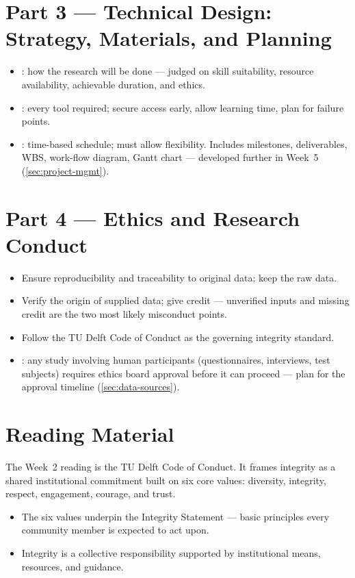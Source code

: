\documentclass[../main.tex]{subfiles}
\begin{document}
\section{Part 3 — Technical Design: Strategy, Materials, and Planning}
\label{sec:strategy-materials}

\begin{itemize}
  \item {}: how the research will be done — judged on skill suitability, resource availability, achievable duration, and ethics.
  \item {}: every tool required; secure access early, allow learning time, plan for failure points.
  \item {}: time-based schedule; must allow flexibility. Includes milestones, deliverables, WBS, work-flow diagram, Gantt chart — developed further in Week~5 (\autoref{sec:project-mgmt}).
\end{itemize}

\section{Part 4 — Ethics and Research Conduct}
\label{sec:ethics}

\begin{itemize}
  \item Ensure reproducibility and traceability to original data; keep the raw data.
  \item Verify the origin of supplied data; give credit — unverified inputs and missing credit are the two most likely misconduct points.
  \item Follow the TU Delft Code of Conduct as the governing integrity standard.
  \item {}: any study involving human participants (questionnaires, interviews, test subjects) requires ethics board approval before it can proceed — plan for the approval timeline (\autoref{sec:data-sources}).
\end{itemize}

\section{Reading Material}
\label{sec:reading2}

\begin{partbox}
The Week~2 reading is the TU Delft Code of Conduct. It frames integrity as a shared institutional commitment built on six core values: diversity, integrity, respect, engagement, courage, and trust.
\end{partbox}

\begin{itemize}
  \item The six values underpin the Integrity Statement — basic principles every community member is expected to act upon.
  \item Integrity is a collective responsibility supported by institutional means, resources, and guidance.
\end{itemize}
\end{document}
